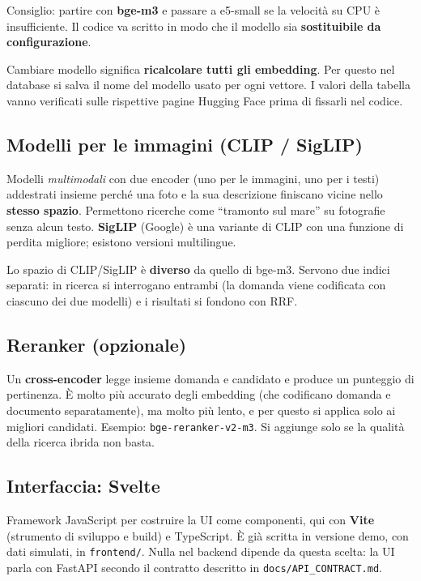 \documentclass[11pt,a4paper]{article}
\newcommand{\code}[1]{\texttt{\small #1}}
\begin{document}
Consiglio: partire con \textbf{bge-m3} e passare a e5-small se la velocità su CPU è insufficiente. Il codice va scritto in modo che il modello sia \textbf{sostituibile da configurazione}.

\begin{nota}
Cambiare modello significa \textbf{ricalcolare tutti gli embedding}. Per questo nel database si salva il nome del modello usato per ogni vettore. I valori della tabella vanno verificati sulle rispettive pagine Hugging Face prima di fissarli nel codice.
\end{nota}

\subsection{Modelli per le immagini (CLIP / SigLIP)}
Modelli \emph{multimodali} con due encoder (uno per le immagini, uno per i testi) addestrati insieme perché una foto e la sua descrizione finiscano vicine nello \textbf{stesso spazio}. Permettono ricerche come ``tramonto sul mare'' su fotografie senza alcun testo. \textbf{SigLIP} (Google) è una variante di CLIP con una funzione di perdita migliore; esistono versioni multilingue.

\begin{nota}
Lo spazio di CLIP/SigLIP è \textbf{diverso} da quello di bge-m3. Servono due indici separati: in ricerca si interrogano entrambi (la domanda viene codificata con ciascuno dei due modelli) e i risultati si fondono con RRF.
\end{nota}

\subsection{Reranker (opzionale)}
Un \textbf{cross-encoder} legge insieme domanda e candidato e produce un punteggio di pertinenza. È molto più accurato degli embedding (che codificano domanda e documento separatamente), ma molto più lento, e per questo si applica solo ai migliori candidati. Esempio: \code{bge-reranker-v2-m3}. Si aggiunge solo se la qualità della ricerca ibrida non basta.

\subsection{Interfaccia: Svelte}
Framework JavaScript per costruire la UI come componenti, qui con \textbf{Vite} (strumento di sviluppo e build) e TypeScript. È già scritta in versione demo, con dati simulati, in \code{frontend/}. Nulla nel backend dipende da questa scelta: la UI parla con FastAPI secondo il contratto descritto in \code{docs/API\_CONTRACT.md}.
\end{document}
